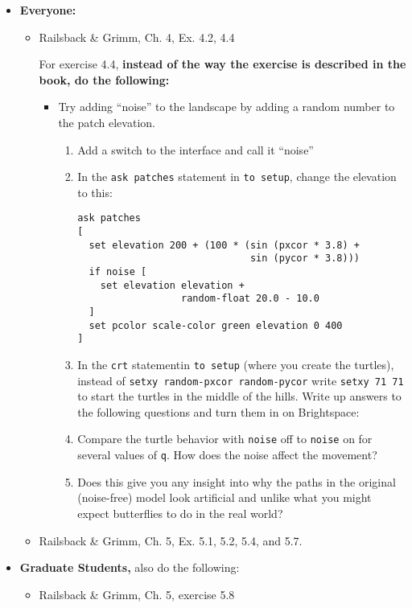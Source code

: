 \documentclass[
]{article}
\providecommand{\tightlist}{%
  \setlength{\itemsep}{0pt}\setlength{\parskip}{0pt}}
\begin{document}
\begin{itemize}
\item
  \textbf{Everyone:}

  \begin{itemize}
  \item
    Railsback \& Grimm, Ch. 4, Ex. 4.2, 4.4

    For exercise 4.4, \textbf{instead of the way the exercise is
    described in the book, do the following:}

    \begin{itemize}
    \tightlist
    \item
      Try adding ``noise'' to the landscape by adding a random number to
      the patch elevation.

      \begin{enumerate}
      \def\labelenumi{\arabic{enumi}.}
      \item
        Add a switch to the interface and call it ``noise''
      \item
        In the \texttt{ask\ patches} statement in \texttt{to\ setup},
        change the elevation to this:

\begin{verbatim}
ask patches
[
  set elevation 200 + (100 * (sin (pxcor * 3.8) +
                              sin (pycor * 3.8)))
  if noise [
    set elevation elevation +
                  random-float 20.0 - 10.0
  ]
  set pcolor scale-color green elevation 0 400
]
\end{verbatim}
      \item
        In the \texttt{crt} statementin \texttt{to\ setup} (where you
        create the turtles), instead of
        \texttt{setxy\ random-pxcor\ random-pycor} write
        \texttt{setxy\ 71\ 71} to start the turtles in the middle of the
        hills. Write up answers to the following questions and turn them
        in on Brightspace:
      \item
        Compare the turtle behavior with \texttt{noise} off to
        \texttt{noise} on for several values of \texttt{q}. How does the
        noise affect the movement?
      \item
        Does this give you any insight into why the paths in the
        original (noise-free) model look artificial and unlike what you
        might expect butterflies to do in the real world?
      \end{enumerate}
    \end{itemize}
  \item
    Railsback \& Grimm, Ch. 5, Ex. 5.1, 5.2, 5.4, and 5.7.
  \end{itemize}
\item
  \textbf{Graduate Students,} also do the following:

  \begin{itemize}
  \tightlist
  \item
    Railsback \& Grimm, Ch. 5, exercise 5.8
  \end{itemize}
\end{itemize}
\end{document}
